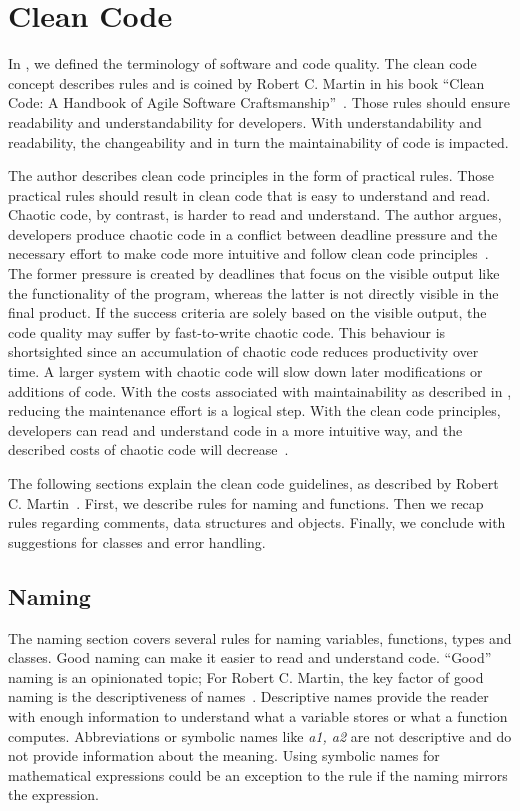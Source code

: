 \section{Clean Code}\label{sec:clean_code}
In , we defined the terminology of software and code quality. The clean code concept describes rules and is coined by Robert C. Martin in his book \enquote{Clean Code: A Handbook of Agile Software Craftsmanship}~\cite{martin_clean_2009}. Those rules should ensure readability and understandability for developers. With understandability and readability, the changeability and in turn the maintainability of code is impacted.   

The author describes clean code principles in the form of practical rules. Those practical rules should result in clean code that is easy to understand and read. Chaotic code, by contrast, is harder to read and understand. The author argues, developers produce chaotic code in a conflict between deadline pressure and the necessary effort to make code more intuitive and follow clean code principles~\cite{martin_clean_2009}. The former pressure is created by deadlines that focus on the visible output like the functionality of the program, whereas the latter is not directly visible in the final product. If the success criteria are solely based on the visible output, the code quality may suffer by fast-to-write chaotic code. This behaviour is shortsighted since an accumulation of chaotic code reduces productivity over time. A larger system with chaotic code will slow down later modifications or additions of code. With the costs associated with maintainability as described in , reducing the maintenance effort is a logical step. With the clean code principles, developers can read and understand code in a more intuitive way, and the described costs of chaotic code will decrease~\cite{martin_clean_2009}.

The following sections explain the clean code guidelines, as described by Robert C. Martin~\cite{martin_clean_2009}. First, we describe rules for naming and functions. Then we recap rules regarding comments, data structures and objects. Finally, we conclude with suggestions for classes and error handling.

\subsection{Naming}\label{sec:naming}
The naming section covers several rules for naming variables, functions, types and classes.
Good naming can make it easier to read and understand code. \enquote{Good} naming is an opinionated topic; For Robert C. Martin, the key factor of good naming is the descriptiveness of names~\cite{martin_clean_2009}. Descriptive names provide the reader with enough information to understand what a variable stores or what a function computes. Abbreviations or symbolic names like \textit{a1, a2} are not descriptive and do not provide information about the meaning. Using symbolic names for mathematical expressions could be an exception to the rule if the naming mirrors the expression.

